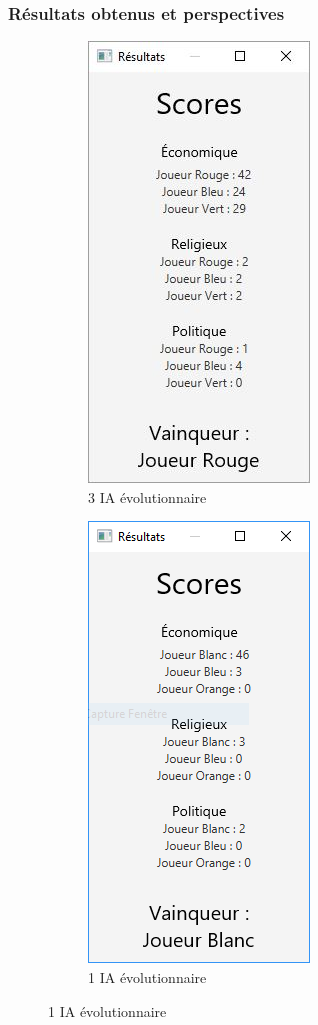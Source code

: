 \begin{frame}
	\frametitle{Résultats obtenus et perspectives}
	\begin{figure}
		\begin{subfigure}{0.5\textwidth}
			\centering
			\includegraphics[width=0.4\linewidth]{images/resultats}
			\caption{3 IA évolutionnaire}
		\end{subfigure}
		\begin{subfigure}{0.4\textwidth}
			\centering
			\includegraphics[width=0.5\linewidth]{images/score_evol_vs_random}
			\caption{1 IA évolutionnaire}
		\end{subfigure}
	\end{figure}
\end{frame}